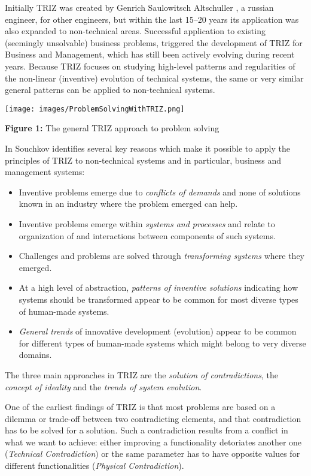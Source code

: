 \documentclass[11pt,a4paper]{article}
\begin{document}
Initially TRIZ was created by Genrich Saulowitsch Altschuller \cite{3}, a
russian engineer, for other engineers, but within the last 15--20 years its
application was also expanded to non-technical areas. Successful application
to existing (seemingly unsolvable) business problems, triggered the
development of TRIZ for Business and Management, which has still been actively
evolving during recent years. Because TRIZ focuses on studying high-level
patterns and regularities of the non-linear (inventive) evolution of technical
systems, the same or very similar general patterns can be applied to
non-technical systems.

\begin{center}
  \texttt{[image: images/ProblemSolvingWithTRIZ.png]}
    
  \textbf{Figure 1:} The general TRIZ approach to problem solving \cite{4}
\end{center}

In \cite{5} Souchkov identifies several key reasons which make it possible to
apply the principles of TRIZ to non-technical systems and in particular,
business and management systems:
\begin{itemize}
\item Inventive problems emerge due to \emph{conflicts of demands} and none of
  solutions known in an industry where the problem emerged can help.
\item Inventive problems emerge within \emph{systems and processes} and relate
  to organization of and interactions between components of such systems.
\item Challenges and problems are solved through \emph{transforming systems}
  where they emerged.
\item At a high level of abstraction, \emph{patterns of inventive solutions}
  indicating how systems should be transformed appear to be common for most
  diverse types of human-made systems.
\item \emph{General trends} of innovative development (evolution) appear to be
  common for different types of human-made systems which might belong to very
  diverse domains. 
\end{itemize}
The three main approaches in TRIZ are the \emph{solution of contradictions},
the \emph{concept of ideality} and the \emph{trends of system evolution}.
\cite{6}

One of the earliest findings of TRIZ is that most problems are based on a
dilemma or trade-off between two contradicting elements, and that
contradiction has to be solved for a solution. Such a contradiction results
from a conflict in what we want to achieve: either improving a functionality
detoriates another one (\emph{Technical Contradiction}) or the same parameter
has to have opposite values for different functionalities (\emph{Physical
  Contradiction}).
\end{document}
